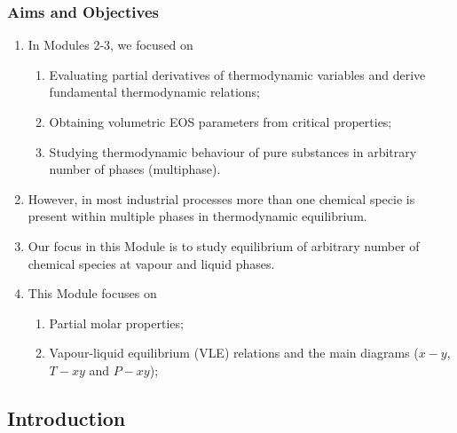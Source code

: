 \documentclass[10pt,compress,unknownkeysallowed]{beamer}
\begin{document}
\begin{frame}
 \frametitle{Aims and Objectives}
   \begin{enumerate}
     \item<1-> In Modules 2-3, we focused on 
       \begin{enumerate}
         \item<1-> Evaluating partial derivatives of thermodynamic variables and derive fundamental thermodynamic relations;
         \item<1-> Obtaining volumetric EOS parameters from critical properties;
         \item<1-> Studying thermodynamic behaviour of pure substances in arbitrary number of phases (multiphase).
       \end{enumerate} 
     \item<2-> However, in most industrial processes more than one chemical specie is present within multiple phases in thermodynamic equilibrium. 
     \item<3-> Our focus in this Module is to study equilibrium of arbitrary number of chemical species at vapour and liquid phases.
     \item<4-> This Module focuses on 
         \begin{enumerate}
           \item<4-> Partial molar properties; 
           \item<4-> Vapour-liquid equilibrium (VLE) relations and the main diagrams ($x-y$, $T-xy$ and $P-xy$); 
         \end{enumerate}
   \end{enumerate}
\end{frame}




\subsection{Introduction} 
\end{document}
